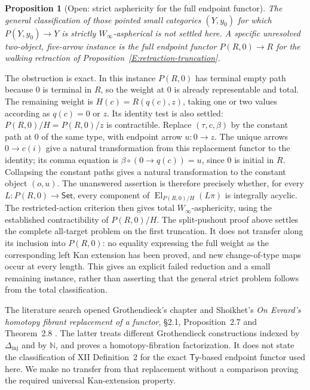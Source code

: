 \documentclass[11pt,a4paper]{article}
\newtheorem{proposition}[theorem]{Proposition}
\theoremstyle{definition}
\theoremstyle{remark}
\begin{document}
\begin{proposition}[Open: strict asphericity for the full endpoint functor]
\label{E:strict-open}
The general classification of those pointed small categories $(Y,y_0)$
for which $P(Y,y_0)\to Y$ is strictly $W_\infty$-aspherical is not
settled here.  A specific unresolved two-object, five-arrow instance is
the full endpoint functor $P(R,0)\to R$ for the walking retraction of
Proposition~\ref{E:retraction-truncation}.
\end{proposition}

The obstruction is exact.  In this instance $P(R,0)$ has terminal
empty path because $0$ is terminal in $R$, so the weight at $0$ is
already representable and total.  The remaining weight is
$H(c)=R(q(c),z)$, taking one or two values according as $q(c)=0$ or
$z$.  Its identity test is also settled:
$P(R,0)/H=P(R,0)/z$ is contractible.  Replace $(\tau,c,\beta)$ by
the constant path at $0$ of the same type, with endpoint arrow
$u:0\to z$.  The unique arrows $0\to c(i)$ give a natural
transformation from this replacement functor to the identity; its
comma equation is $\beta\circ(0\to q(c))=u$, since $0$ is initial
in $R$.  Collapsing the constant paths gives a natural transformation
to the constant object $(o,u)$.  The unanswered assertion is
therefore precisely whether, for every
$L:P(R,0)\to\mathsf{Set}$, every component of
$\operatorname{El}_{P(R,0)/H}(L\pi)$ is integrally acyclic.  The
restricted-action criterion then gives total $W_\infty$-asphericity,
using the established contractibility of $P(R,0)/H$.  The split-pushout proof above
settles the complete all-target problem on the first truncation.
It does not transfer along its inclusion into $P(R,0)$: no equality
expressing the full weight as the corresponding left Kan extension
has been proved, and new change-of-type maps occur at every length.
This gives an explicit failed reduction and a small remaining instance,
rather than asserting that the general strict problem follows from
the total classification.

The literature search opened Grothendieck's chapter and Shoikhet's
\emph{On Evrard's homotopy fibrant replacement of a functor},
\S2.1, Proposition~2.7 and Theorem~2.8 \citep{Shoikhet2016}.  The latter treats different
Grothendieck constructions indexed by $\Delta_{\mathrm{inj}}$ and by
$\mathbb N$, and proves a homotopy-fibration factorization.  It does
not state the classification of XII Definition~2 for the exact
$\mathsf{Ty}$-based endpoint functor used here.  We make no transfer
from that replacement without a comparison proving the required
universal Kan-extension property.
\end{document}
